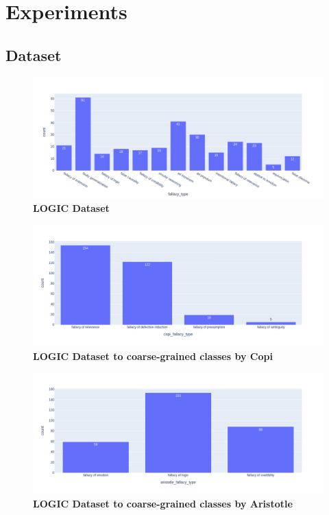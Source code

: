 \chapter{Experiments}



\section{Dataset}

\begin{figure}[H]
\centering
\includegraphics[width=\textwidth]{graphics/fine_grained_distribution.png}
\caption{\textbf{LOGIC Dataset}}
\end{figure}

\begin{figure}[H]
\centering
\includegraphics[width=\textwidth]{graphics/copi_distribution.png}
\caption{\textbf{LOGIC Dataset to coarse-grained classes by Copi}}
\end{figure}

\begin{figure}[H]
\centering
\includegraphics[width=\textwidth]{graphics/aristotle_distribution.png}
\caption{\textbf{LOGIC Dataset to coarse-grained classes by Aristotle}}
\end{figure}

